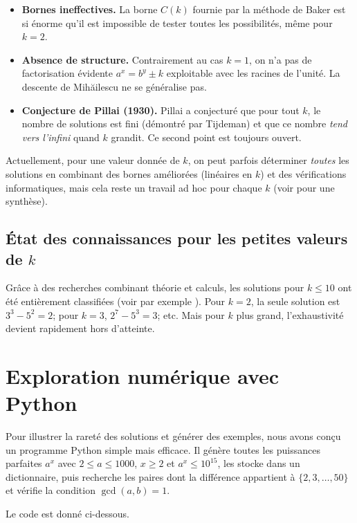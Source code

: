 \documentclass[12pt,a4paper]{article}
\theoremstyle{plain}
\theoremstyle{definition}
\begin{document}
\begin{itemize}
    \item \textbf{Bornes ineffectives.} La borne $C(k)$ fournie par la méthode de Baker est si énorme qu'il est impossible de tester toutes les possibilités, même pour $k=2$.
    \item \textbf{Absence de structure.} Contrairement au cas $k=1$, on n'a pas de factorisation évidente $a^x = b^y \pm k$ exploitable avec les racines de l'unité. La descente de Mihăilescu ne se généralise pas.
    \item \textbf{Conjecture de Pillai (1930).} Pillai a conjecturé que pour tout $k$, le nombre de solutions est fini (démontré par Tijdeman) et que ce nombre \emph{tend vers l'infini} quand $k$ grandit. Ce second point est toujours ouvert.
\end{itemize}

Actuellement, pour une valeur donnée de $k$, on peut parfois déterminer \emph{toutes} les solutions en combinant des bornes améliorées (linéaires en $k$) et des vérifications informatiques, mais cela reste un travail ad hoc pour chaque $k$ (voir \cite{Bugeaud2008} pour une synthèse).

\subsection{État des connaissances pour les petites valeurs de $k$}

Grâce à des recherches combinant théorie et calculs, les solutions pour $k \le 10$ ont été entièrement classifiées (voir par exemple \cite{Mignotte}). Pour $k=2$, la seule solution est $3^3 - 5^2 = 2$; pour $k=3$, $2^7 - 5^3 = 3$; etc. Mais pour $k$ plus grand, l'exhaustivité devient rapidement hors d'atteinte.

\section{Exploration numérique avec Python}
\label{sec:num}

Pour illustrer la rareté des solutions et générer des exemples, nous avons conçu un programme Python simple mais efficace. Il génère toutes les puissances parfaites $a^x$ avec $2 \le a \le 1000$, $x \ge 2$ et $a^x \le 10^{15}$, les stocke dans un dictionnaire, puis recherche les paires dont la différence appartient à $\{2,3,\dots,50\}$ et vérifie la condition $\gcd(a,b)=1$.

Le code est donné ci-dessous.
\end{document}
